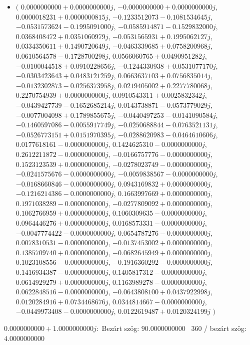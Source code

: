 \documentclass[14pt,a4paper]{article}
\begin{document}
\begin{itemize}
\item
$\big($
$0.0000000000+0.0000000000j$, $-0.0000000000+0.0000000000j$, $0.0000018231+0.0000000815j$, $-0.1233512073-0.1081534645j$, $-0.0531573624-0.1995091000j$, $-0.0585914871-0.1529832000j$, $0.0368408472+0.0351060979j$, $-0.0531565931+0.1995062127j$, $0.0334350611+0.1490720649j$, $-0.0463339685+0.0758200968j$, $0.0610564578-0.1728700298j$, $0.0566060765+0.0490951282j$, $-0.0100044518+0.0910228656j$, $-0.1244330938+0.0531077170j$, $-0.0303423643+0.0483121259j$, $0.0663637103+0.0756835014j$, $-0.0132302873-0.0256373958j$, $0.0219405002+0.2277780068j$, $0.2270754939+0.0000000000j$, $0.0910543311+0.0025832342j$, $-0.0439427739-0.1652685214j$, $0.0143738871-0.0573779029j$, $-0.0077004098+0.1789855675j$, $-0.0440497253-0.0141090584j$, $-0.1460597086-0.0055917749j$, $-0.0250688844-0.0763521131j$, $-0.0526773151+0.0151970395j$, $-0.0288620983-0.0464610606j$, $0.0177618161-0.0000000000j$, $0.1424625310-0.0000000000j$, $0.2612211872-0.0000000000j$, $-0.0166757776-0.0000000000j$, $0.1523123539+0.0000000000j$, $-0.0278023749-0.0000000000j$, $-0.0241575676-0.0000000000j$, $-0.0059838567-0.0000000000j$, $-0.0168660846-0.0000000000j$, $0.0943169832+0.0000000000j$, $-0.1216214386-0.0000000000j$, $0.1663997669+0.0000000000j$, $0.1971038289-0.0000000000j$, $-0.0277809092+0.0000000000j$, $0.1062766959+0.0000000000j$, $0.1060309635-0.0000000000j$, $0.0964446276+0.0000000000j$, $0.0168573331-0.0000000000j$, $-0.0047774422-0.0000000000j$, $0.0654787276-0.0000000000j$, $0.0078310531-0.0000000000j$, $-0.0137453002+0.0000000000j$, $0.1385709740+0.0000000000j$, $-0.0682645949+0.0000000000j$, $0.1023108556-0.0000000000j$, $-0.1916360292-0.0000000000j$, $0.1416934387-0.0000000000j$, $0.1405817312-0.0000000000j$, $0.0614929279+0.0000000000j$, $0.1163989278-0.0000000000j$, $0.0622848516-0.0000000000j$, $-0.0643808100+0.0437922998j$, $0.0120284916+0.0734468676j$, $0.0344814667-0.0000000000j$, $-0.0449973408-0.0000000000j$, $0.0122619487+0.0120324199j$
$\big)$
\end{itemize}
$0.0000000000+1.0000000000j$:\
Bezárt szög: $90.0000000000$ \
360 / bezárt szög: $4.0000000000$\
\end{document}
